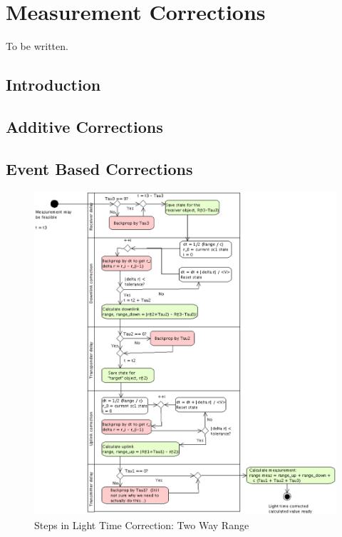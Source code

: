 \chapter{\label{ch:MeasurementCorrections}Measurement Corrections}


To be written.

\section{Introduction}

\section{Additive Corrections}

\section{Event Based Corrections}

\begin{figure}
\begin{center}
\includegraphics[scale=0.52]{Images/EventLocationLightTimeCorrection.eps}
\caption{Steps in Light Time Correction: Two Way Range}
\end{center}
\end{figure}


